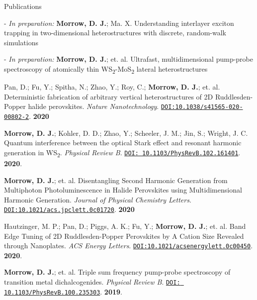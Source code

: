 \documentclass{resume} %
\begin{document}
\begin{rSection}{Publications}
	
\begin{etaremune}[topsep=0pt,itemsep=0pt,partopsep=0pt,parsep=0pt]

\item[-] \textit{In preparation:} \textbf{Morrow, D. J.}; Ma. X. Understanding interlayer exciton trapping in two-dimensional heterostructures with discrete, random-walk simulations

\item[-] \textit{In preparation:} \textbf{Morrow, D. J.}; et. al. Ultrafast, multidimensional pump-probe spectroscopy of atomically thin WS\textsubscript{2}-MoS\textsubscript{2} lateral heterostructures

\item  Pan, D.; Fu, Y.; Spitha, N.; Zhao, Y.; Roy, C.; \textbf{Morrow, D. J.}; et. al. Deterministic fabrication of arbitrary vertical heterostructures of 2D Ruddlesden-Popper halide perovskites.  \emph{Nature Nanotechnology}. \href{https://doi.org/10.1038/s41565-020-00802-2}{\texttt{DOI:10.1038/s41565-020-00802-2}}. \textbf{2020}


\item \textbf{Morrow, D. J.}; Kohler, D. D.; Zhao, Y.; Scheeler, J. M.; Jin, S.; Wright, J. C.	Quantum interference between the optical Stark effect and resonant harmonic generation in WS\textsubscript{2}.  \emph{Physical Review B}. \href{https://journals.aps.org/pra/abstract/10.1103/PhysRevB.102.161401}{\texttt{DOI: 10.1103/PhysRevB.102.161401}}. \textbf{2020}.

\item \textbf{Morrow, D. J.}; et. al. Disentangling Second Harmonic Generation from Multiphoton Photoluminescence in Halide Perovskites using Multidimensional Harmonic Generation. \emph{Journal of Physical Chemistry Letters}. \href{https://pubs.acs.org/doi/10.1021/acs.jpclett.0c01720}{\texttt{DOI:10.1021/acs.jpclett.0c01720}}. \textbf{2020}

\item Hautzinger, M. P.; Pan, D.; Piggs, A. K.; Fu, Y.; \textbf{Morrow, D. J.}; et. al. Band Edge Tuning of 2D Ruddlesden-Popper Perovskites by A Cation Size Revealed through Nanoplates. \emph{ACS Energy Letters}. \href{https://pubs.acs.org/doi/10.1021/acsenergylett.0c00450}{\texttt{DOI:10.1021/acsenergylett.0c00450}}. \textbf{2020}. 

\item  \textbf{Morrow, D. J.}; et. al. Triple sum frequency pump-probe spectroscopy of transition metal dichalcogenides. \emph{Physical Review B}. \href{https://journals.aps.org/pra/abstract/10.1103/PhysRevB.100.235303}{\texttt{DOI: 10.1103/PhysRevB.100.235303}}. \textbf{2019}.


\end{etaremune}
\end{rSection}
\end{document}
